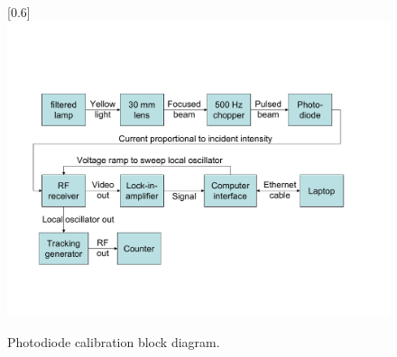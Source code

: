 \begin{figure}
\scalebox{0.6}[0.6]{
\includegraphics*[bb=12 67 665 429]
{PD_cal_block/PD_cal_block.pdf}
}
\caption[Photodiode calibration block diagram]{Photodiode calibration block diagram.}
\label{PD_cal_block}
\end{figure}
